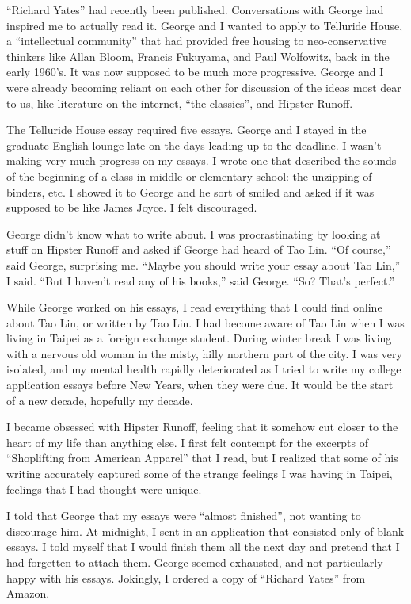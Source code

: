 ``Richard Yates'' had recently been published.  Conversations with George had
inspired me to actually read it.  George and I wanted to apply to Telluride
House, a ``intellectual community'' that had provided free housing to
neo-conservative thinkers like Allan Bloom, Francis Fukuyama, and Paul
Wolfowitz, back in the early 1960's.  It was now supposed to be much more
progressive.  George and I were already becoming reliant on each other for
discussion of the ideas most dear to us, like literature on the internet, ``the
classics'', and Hipster Runoff. 

The Telluride House essay required five essays.  George and I stayed in the
graduate English lounge late on the days leading up to the deadline.  I wasn't
making very much progress on my essays.  I wrote one that described the sounds
of the beginning of a class in middle or elementary school: the unzipping of
binders, etc.  I showed it to George and he sort of smiled and asked if it was
supposed to be like James Joyce.  I felt discouraged. 

George didn't know what to write about.  I was procrastinating by looking at
stuff on Hipster Runoff and asked if George had heard of Tao Lin.  ``Of
course,'' said George, surprising me.  ``Maybe you should write your essay about
Tao Lin,'' I said.  ``But I haven't read any of his books,'' said George.  ``So?
That's perfect.''

While George worked on his essays, I read everything that I could find online
about Tao Lin, or written by Tao Lin.  I had become aware of  Tao Lin when I was
living in Taipei as a foreign exchange student.  During winter break I was
living with a nervous old woman in the misty, hilly northern part of the city.
I was very isolated, and my mental health rapidly deteriorated as I tried to
write my college application essays before New Years, when they were due.  It
would be the start of a new decade, hopefully my decade.

I became obsessed with Hipster Runoff, feeling that it somehow cut closer to the
heart of my life than anything else.  I first felt contempt for the excerpts of
``Shoplifting from American Apparel'' that I read, but I realized that some of his
writing accurately captured some of the strange feelings I was having in Taipei,
feelings that I had thought were unique.

I told that George that my essays were ``almost finished'', not wanting to
discourage him.  At midnight, I sent in an application that consisted only of
blank essays.  I told myself that I would finish them all the next day and
pretend that I had forgetten to attach them.  George seemed exhausted, and not
particularly happy with his essays.  Jokingly, I ordered a copy of ``Richard
Yates'' from Amazon.

